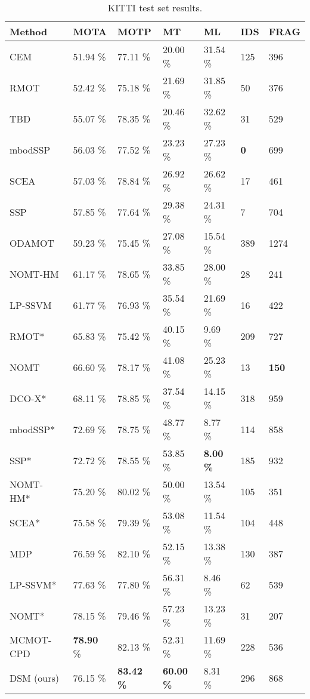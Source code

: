 \documentclass[letterpaper, 10 pt, conference]{ieeeconf}  \pdfminorversion=4
\begin{document}
\begin{table*}[htb]
 \centering
 \begin{tabular}{lllllll}
  \hline
  Method & MOTA & MOTP & MT & ML & IDS & FRAG \\\hline
  CEM \cite{Milan2014PAMI} & 51.94 \% & 77.11 \% & 20.00 \% & 31.54 \% & 125 & 396 \\
  RMOT \cite{Yoon2015WACV} & 52.42 \% & 75.18 \% & 21.69 \% & 31.85 \% & 50 & 376 \\
  TBD \cite{Geiger2014PAMI} & 55.07 \% & 78.35 \% & 20.46 \% & 32.62 \% & 31 & 529 \\
  mbodSSP \cite{onlinemcf} & 56.03 \% & 77.52 \% & 23.23 \% & 27.23 \% & \textbf{0} & 699 \\
  SCEA \cite{Yoon2016CVPR} & 57.03 \% & 78.84 \% & 26.92 \% & 26.62 \% & 17 & 461 \\
  SSP \cite{onlinemcf} & 57.85 \% & 77.64 \% & 29.38 \% & 24.31 \% & 7 & 704 \\
  ODAMOT \cite{Gaidon2015BMVC} & 59.23 \% & 75.45 \% & 27.08 \% & 15.54 \% & 389 & 1274 \\
  NOMT-HM \cite{Choi2015ICCV} & 61.17 \% & 78.65 \% & 33.85 \% & 28.00 \% & 28 & 241 \\
  LP-SSVM \cite{Wang2016IJCV} & 61.77 \% & 76.93 \% & 35.54 \% & 21.69 \% & 16 & 422 \\
  RMOT* \cite{Yoon2015WACV} & 65.83 \% & 75.42 \% & 40.15 \% & 9.69 \% & 209 & 727 \\
  NOMT \cite{Choi2015ICCV} & 66.60 \% & 78.17 \% & 41.08 \% & 25.23 \% & 13 & \textbf{150} \\
  DCO-X* \cite{Milan2013CVPR} & 68.11 \% & 78.85 \% & 37.54 \% & 14.15 \% & 318 & 959 \\
  mbodSSP* \cite{onlinemcf} & 72.69 \% & 78.75 \% & 48.77 \% & 8.77 \% & 114 & 858 \\
  SSP* \cite{onlinemcf} & 72.72 \% & 78.55 \% & 53.85 \% & \textbf{8.00 \%} & 185 & 932 \\
  NOMT-HM* \cite{Choi2015ICCV} & 75.20 \% & 80.02 \% & 50.00 \% & 13.54 \% & 105 & 351 \\
  SCEA* \cite{Yoon2016CVPR} & 75.58 \% & 79.39 \% & 53.08 \% & 11.54 \% & 104 & 448 \\
  MDP \cite{Xiang2015ICCV} & 76.59 \% & 82.10 \% & 52.15 \% & 13.38 \% & 130 & 387 \\
  LP-SSVM* \cite{Wang2016IJCV} & 77.63 \% & 77.80 \% & 56.31 \% & 8.46 \% & 62 & 539 \\
  NOMT* \cite{Choi2015ICCV} & 78.15 \% & 79.46 \% & 57.23 \% & 13.23 \% & 31 & 207 \\
  MCMOT-CPD \cite{Lee2016ECCVWORK} & \textbf{78.90} \% & 82.13 \% & 52.31 \% & 11.69 \% & 228 & 536 \\ \hline
  DSM (ours) & 76.15 \% & \textbf{83.42 \%} & \textbf{60.00 \%} & 8.31 \% & 296 & 868 \\
  \end{tabular}
\caption{KITTI test set results.}
\label{tab:test-results}
\end{table*}
\end{document}

